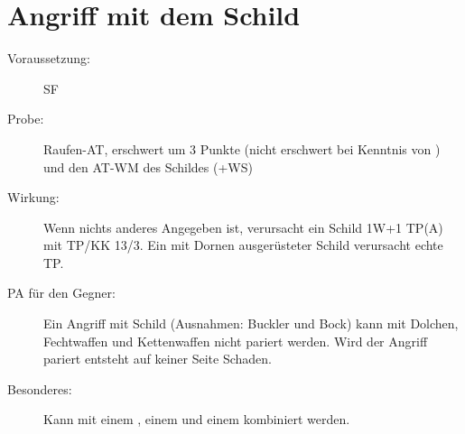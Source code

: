 \section{Angriff mit dem Schild}
\label{bAT.angriff_mit_dem_schild}
\begin{description}
    \item[Voraussetzung:]
        SF 
    \item[Probe:]
        Raufen-AT, erschwert um 3 Punkte (nicht erschwert bei Kenntnis von ) und den AT-WM des Schildes (+WS)
    \item[Wirkung:]
        Wenn nichts anderes Angegeben ist, verursacht ein Schild 1W+1 TP(A) mit TP/KK 13/3.
        Ein mit Dornen ausgerüsteter Schild verursacht echte TP.
    \item[PA für den Gegner:]
        Ein Angriff mit Schild (Ausnahmen: Buckler und Bock) kann mit Dolchen, Fechtwaffen und Kettenwaffen nicht pariert werden.
        Wird der Angriff pariert entsteht auf keiner Seite Schaden.
    \item[Besonderes:]
        Kann mit einem , einem  und einem  kombiniert werden.
\end{description}
